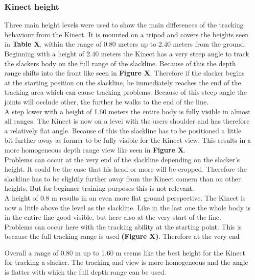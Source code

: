 \subsubsection{Kinect height}
Three main height levels were used to show the main differences of the tracking behaviour from the Kinect. It is mounted on a tripod and covers the heights seen in \textbf{Table X}, within the range of 0.80 meters up to 2.40 meters from the ground.
\\
Beginning with a height of 2.40 meters the Kinect has a very steep angle to track the slackers body on the full range of the slackline. Because of this the depth range shifts into the front like seen in \textbf{Figure X}. Therefore if the slacker begins at the starting position on the slackline, he immediately reaches the end of the tracking area which can cause tracking problems. Because of this steep angle the joints will occlude other, the further he walks to the end of the line.
\\
A step lower with a height of 1.60 meters the entire body is fully visible in almost all ranges. The Kinect is now on a level with the users shoulder and has therefore a relatively flat angle. Because of this the slackline has to be positioned a little bit further away as former to be fully visible for the Kinect view. This results in a more homogeneous depth range view like seen in \textbf{Figure X}.
\\
Problems can occur at the very end of the slackline depending on the slacker’s height. It could be the case that his head or more will be cropped. Therefore the slackline has to be slightly further away from the Kinect camera than on other heights. But for beginner training purposes this is not relevant.
\\
A height of 0.8 m results in an even more flat ground perspective. The Kinect is now a little above the level as the slackline. Like in the last one the whole body is in the entire line good visible, but here also at the very start of the line. Problems can occur here with the tracking ability at the starting point. This is because the full tracking range is used \textbf{(Figure X)}. Therefore at the very end  

Overall a range of 0.80 m up to 1.60 m seems like the best height for the Kinect for tracking a slacker. The tracking and view is more homogeneous and the angle is flatter with which the full depth range can be used.

